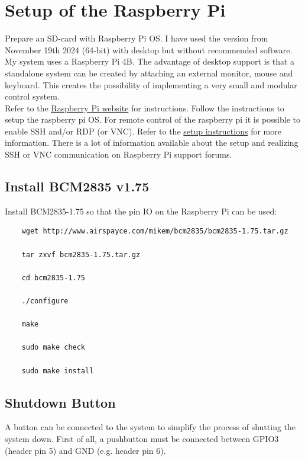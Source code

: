 \section{Setup of the Raspberry Pi}
Prepare an SD-card with Raspberry Pi OS. I have used the version from November 19th 2024 (64-bit) with desktop but without recommended software. My system uses a Raspberry Pi 4B. The advantage of desktop support is that a standalone system can be created by attaching an external monitor, mouse and keyboard. This creates the possibility of implementing a very small and modular control system.\\

Refer to the \href{https://projects.raspberrypi.org/en/projects/raspberry-pi-setting-up/2}{Raspberry Pi website} for instructions. Follow the instructions to setup the raspberry pi OS. For remote control of the raspberry pi it is possible to enable SSH and/or RDP (or VNC). Refer to the \href{https://projects.raspberrypi.org/en/projects/raspberry-pi-setting-up/4}{setup instructions} for more information. There is a lot of information available about the setup and realizing SSH or VNC communication on Raspberry Pi support forums.

\subsection{Install BCM2835 v1.75}
Install BCM2835-1.75 so that the pin IO on the Raspberry Pi can be used:
\begin{verbatim}
	wget http://www.airspayce.com/mikem/bcm2835/bcm2835-1.75.tar.gz 
	
	tar zxvf bcm2835-1.75.tar.gz
	
	cd bcm2835-1.75
	
	./configure
	
	make
	
	sudo make check
	
	sudo make install
\end{verbatim}

\subsection{Shutdown Button}


A button can be connected to the system to simplify the process of shutting the system down. First of all, a pushbutton must be connected between GPIO3 (header pin 5) and GND (e.g. header pin 6). \\

